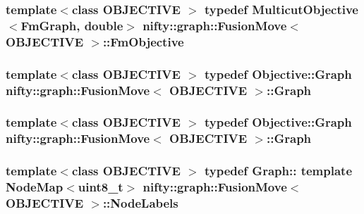 \subsubsection[{Fm\+Objective}]{\setlength{\rightskip}{0pt plus 5cm}template$<$class O\+B\+J\+E\+C\+T\+I\+V\+E $>$ typedef {\bf Multicut\+Objective}$<${\bf Fm\+Graph}, double$>$ {\bf nifty\+::graph\+::\+Fusion\+Move}$<$ O\+B\+J\+E\+C\+T\+I\+V\+E $>$\+::{\bf Fm\+Objective}}\label{classnifty_1_1graph_1_1FusionMove_ad40d83951f141ac8b6fc949995916377}
\hypertarget{classnifty_1_1graph_1_1FusionMove_a76f1d4cff7ee7c3f6033e23ffb761c55}{}
\subsubsection[{Graph}]{\setlength{\rightskip}{0pt plus 5cm}template$<$class O\+B\+J\+E\+C\+T\+I\+V\+E $>$ typedef Objective\+::\+Graph {\bf nifty\+::graph\+::\+Fusion\+Move}$<$ O\+B\+J\+E\+C\+T\+I\+V\+E $>$\+::{\bf Graph}}\label{classnifty_1_1graph_1_1FusionMove_a76f1d4cff7ee7c3f6033e23ffb761c55}
\hypertarget{classnifty_1_1graph_1_1FusionMove_a76f1d4cff7ee7c3f6033e23ffb761c55}{}
\subsubsection[{Graph}]{\setlength{\rightskip}{0pt plus 5cm}template$<$class O\+B\+J\+E\+C\+T\+I\+V\+E $>$ typedef Objective\+::\+Graph {\bf nifty\+::graph\+::\+Fusion\+Move}$<$ O\+B\+J\+E\+C\+T\+I\+V\+E $>$\+::{\bf Graph}}\label{classnifty_1_1graph_1_1FusionMove_a76f1d4cff7ee7c3f6033e23ffb761c55}
\hypertarget{classnifty_1_1graph_1_1FusionMove_a9e4014ff55a0dcf7e4bb6670fe0d0a85}{}
\subsubsection[{Node\+Labels}]{\setlength{\rightskip}{0pt plus 5cm}template$<$class O\+B\+J\+E\+C\+T\+I\+V\+E $>$ typedef Graph\+:: template Node\+Map$<$uint8\+\_\+t$>$ {\bf nifty\+::graph\+::\+Fusion\+Move}$<$ O\+B\+J\+E\+C\+T\+I\+V\+E $>$\+::{\bf Node\+Labels}}\label{classnifty_1_1graph_1_1FusionMove_a9e4014ff55a0dcf7e4bb6670fe0d0a85}
\hypertarget{classnifty_1_1graph_1_1FusionMove_a09c0e32e02ed1d1d38722de4752f019f}{}
